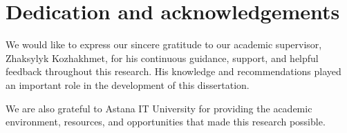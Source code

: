 %
%
\chapter{Dedication and acknowledgements}
\begin{SingleSpace}

We would like to express our sincere gratitude to our academic supervisor, Zhaksylyk Kozhakhmet, for his continuous guidance, support, and helpful feedback throughout this research. His knowledge and recommendations played an important role in the development of this dissertation.

\vspace{12pt} %
\noindent %
We are also grateful to Astana IT University for providing the academic environment, resources, and opportunities that made this research possible.

\end{SingleSpace}
\clearpage